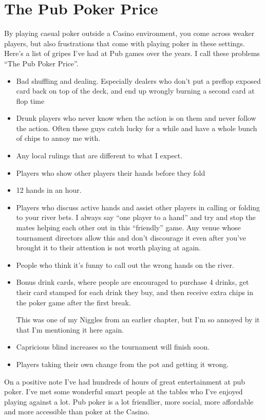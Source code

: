 \chapter{The Pub Poker Price}


By playing casual poker outside a Casino environment, you come across
weaker players, but also frustrations that come with playing
poker in these settings. Here's a list of gripes I've had at Pub
games over the years. I call these problems ``The Pub Poker Price''.

\begin{itemize}

\item Bad shuffling and dealing. Especially dealers who don't
put a preflop exposed card back on top of the deck, and end
up wrongly burning a second card at flop time

\item Drunk players who never know when the action is on them and
never follow the action. Often these guys catch lucky for a while
and have a whole bunch of chips to annoy me with.

\item Any local rulings that are different to what I expect.

\item Players who show other players their hands before they fold

\item 12 hands in an hour.

\item Players who discuss active hands and assist other players in
calling or folding to your river bets. I always say ``one
player to a hand'' and try and stop the mates helping each other
out in this ``friendly'' game. Any venue whose tournament directors
allow this and don't discourage it even after you've brought
it to their attention is not worth playing at again.

\item People who think it's funny to call out the wrong hands on the river.

\item Bonus drink cards, where people are encouraged to purchase 4 drinks,
get their card stamped for each drink they buy, and then receive extra
chips in the poker game after the first break. 

This was one of my Niggles from an earlier chapter, but I'm so annoyed
by it that I'm mentioning it here again.

\item Capricious blind increases so the tournament will finish soon.

\item Players taking their own change from the pot and getting it wrong.

\end{itemize}

On a positive note I've
had hundreds of hours of great entertainment at pub poker. I've
met some wonderful smart people at the tables who I've enjoyed playing
against a lot. Pub poker is a lot friendlier, more social, more affordable
and more accessible than poker at the Casino.

